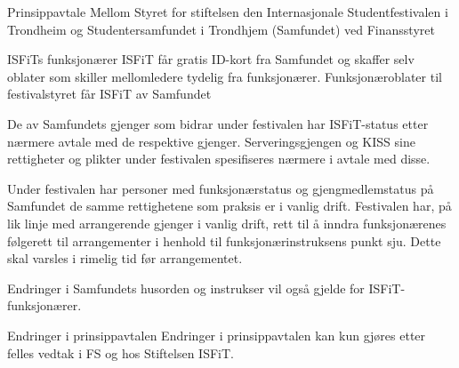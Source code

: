 \begin{instruks*}{Prinsippavtale Mellom Styret for stiftelsen den Internasjonale Studentfestivalen i
        Trondheim og Studentersamfundet i Trondhjem (Samfundet) ved Finansstyret}
\begin{instruksledd}{ISFiTs funksjonærer}
        ISFiT får gratis ID-kort fra Samfundet og skaffer selv oblater som skiller mellomledere tydelig fra
        funksjonærer.
        Funksjonæroblater til festivalstyret får ISFiT av Samfundet

        De av Samfundets gjenger som bidrar under festivalen har ISFiT-status etter nærmere avtale med de
        respektive
        gjenger. Serveringsgjengen og KISS sine rettigheter og plikter under festivalen spesifiseres nærmere
        i avtale med
        disse.

        Under festivalen har personer med funksjonærstatus og gjengmedlemstatus på Samfundet de samme
        rettighetene som
        praksis er i vanlig drift. Festivalen har, på lik linje med arrangerende gjenger i vanlig drift,
        rett til å inndra
        funksjonærenes følgerett til arrangementer i henhold til funksjonærinstruksens punkt sju. Dette skal
        varsles i rimelig
        tid før arrangementet.

        Endringer i Samfundets husorden og instrukser vil også gjelde for ISFiT-funksjonærer.
    \end{instruksledd}


    \begin{instruksledd}{Endringer i prinsippavtalen}
        Endringer i prinsippavtalen kan kun gjøres etter felles vedtak i FS og hos Stiftelsen ISFiT.
    \end{instruksledd} 


\end{instruks*}


